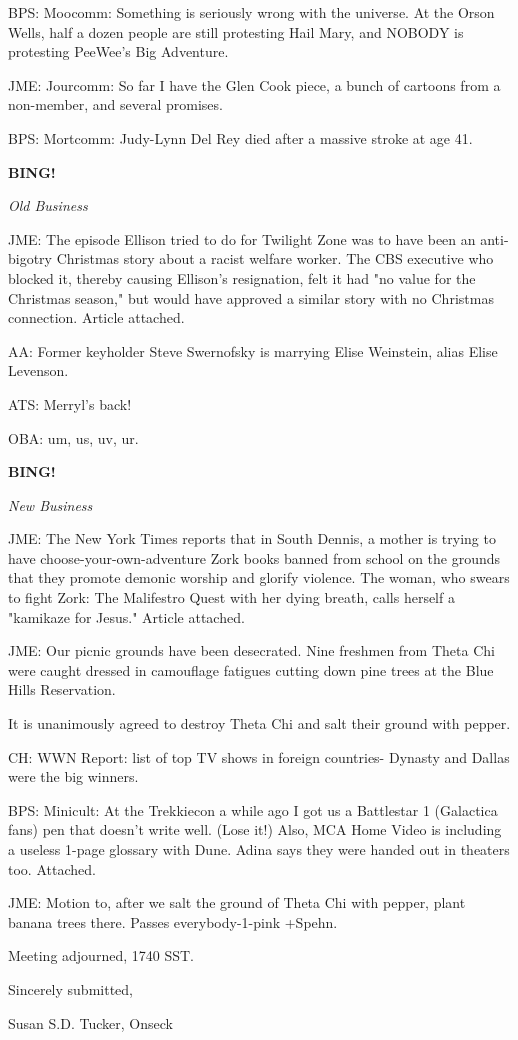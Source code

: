 \documentclass[12pt]{article}
\newcommand{\bing}{{\bf BING!} }
\newcommand{\goto}[1]{\bing \vskip 12pt \centerline{{\em{#1}}}}
\begin{document}
BPS: Moocomm: Something is seriously wrong with the universe. At the Orson Wells, half a dozen people are still protesting Hail Mary, and NOBODY is protesting PeeWee's Big Adventure.

JME: Jourcomm: So far I have the Glen Cook piece, a bunch of cartoons from a non-member, and several promises.

BPS: Mortcomm: Judy-Lynn Del Rey died after a massive stroke at age 41.

\goto{Old Business}

JME: The episode Ellison tried to do for Twilight Zone was to have been an anti-bigotry Christmas story about a racist welfare worker. The CBS executive who blocked it, thereby causing Ellison's resignation, felt it had "no value for the Christmas season," but would have approved a similar story with no Christmas connection. Article attached.

AA: Former keyholder Steve Swernofsky is marrying Elise Weinstein, alias Elise Levenson.

ATS: Merryl's back!

OBA: um, us, uv, ur.

\goto{New Business}

JME: The New York Times reports that in South Dennis, a mother is trying to have choose-your-own-adventure Zork books banned from school on the grounds that they promote demonic worship and glorify violence. The woman, who swears to fight Zork: The Malifestro Quest with her dying breath, calls herself a "kamikaze for Jesus." Article attached.

JME: Our picnic grounds have been desecrated. Nine freshmen from Theta Chi were caught dressed in camouflage fatigues cutting down pine trees at the Blue Hills Reservation.

It is unanimously agreed to destroy Theta Chi and salt their ground with pepper.

CH: WWN Report: list of top TV shows in foreign countries- Dynasty and Dallas were the big winners.

BPS: Minicult: At the Trekkiecon a while ago I got us a Battlestar 1 (Galactica fans) pen that doesn't write well. (Lose it!) Also, MCA Home Video is including a useless 1-page glossary with Dune. Adina says they were handed out in theaters too. Attached.

JME: Motion to, after we salt the ground of Theta Chi with pepper, plant banana trees there. Passes everybody-1-pink +Spehn.

\vspace{12pt}

\noindent
Meeting adjourned, 1740 SST.

\vspace{18pt}

\centerline{Sincerely submitted,}
\centerline{Susan S.D. Tucker, Onseck}
\end{document}
